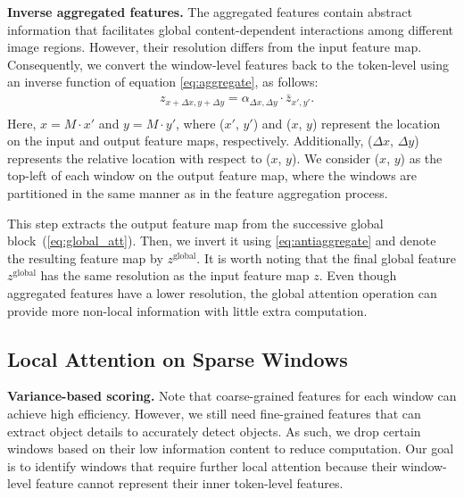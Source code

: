 \vspace{2mm}\noindent\textbf{Inverse aggregated features.} 
The aggregated features contain abstract information that facilitates global content-dependent interactions among different image regions. However, their resolution differs from the input feature map. Consequently, we convert the window-level features back to the token-level using an inverse function of equation \cref{eq:aggregate}, as follows:
\begin{equation}
\begin{split}
     & z_{x+\Delta x,y+\Delta y}  = 
     \alpha _{\Delta x,\Delta y} \cdot  \bar{z}_{x', y'}. \\
\end{split}
\label{eq:antiaggregate}
\end{equation}
Here, $x = M\cdot x'$ and $y = M\cdot y'$, where ($x'$, $y'$) and ($x$, $y$) represent the location on the input and output feature maps, respectively. Additionally, ($\Delta x$, $\Delta y$) represents the relative location with respect to ($x$, $y$). We consider ($x$, $y$) as the top-left of each window on the output feature map, where the windows are partitioned in the same manner as in the feature aggregation process.


This step extracts the output feature map from the successive global block~(\cref{eq:global_att}). Then, we invert it using \cref{eq:antiaggregate} and denote the resulting feature map by $z^{\text{global}}$. It is worth noting that the final global feature $z^{\text{global}}$ has the same resolution as the input feature map $z$. %
Even though aggregated features have a lower resolution, the global attention operation can provide more non-local information with little extra computation.

\subsection{Local Attention on Sparse Windows}
\label{sec:local}

\noindent\textbf{Variance-based scoring.}
Note that coarse-grained features for each window can achieve high efficiency. However, we still need fine-grained features that can extract object details to accurately detect objects. As such, we drop certain windows based on their low information content to reduce computation. Our goal is to identify windows that require further local attention because their window-level feature cannot represent their inner token-level features. 

